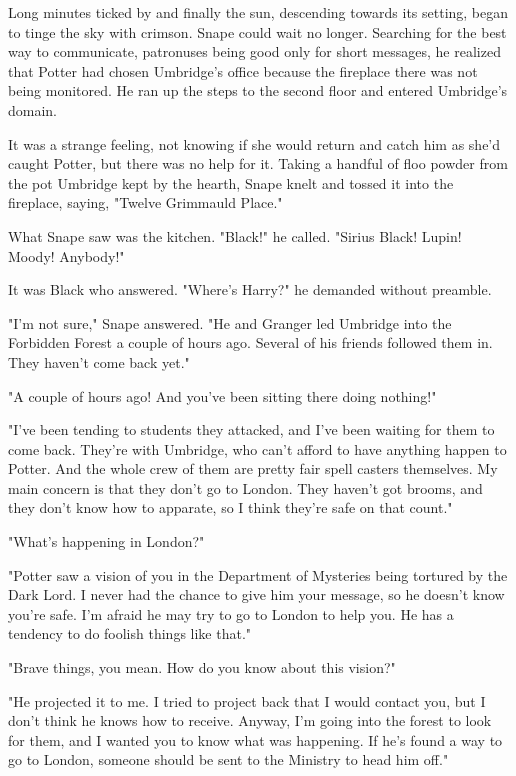 \documentclass[a4paper,11pt]{article}
\begin{document}
Long minutes ticked by and finally the sun, descending towards its setting, began to tinge the sky with crimson. Snape could wait no longer. Searching for the best way to communicate, patronuses being good only for short messages, he realized that Potter had chosen Umbridge's office because the fireplace there was not being monitored. He ran up the steps to the second floor and entered Umbridge's domain.

It was a strange feeling, not knowing if she would return and catch him as she'd caught Potter, but there was no help for it. Taking a handful of floo powder from the pot Umbridge kept by the hearth, Snape knelt and tossed it into the fireplace, saying, "Twelve Grimmauld Place."

What Snape saw was the kitchen. "Black!" he called. "Sirius Black! Lupin! Moody! Anybody!"

It was Black who answered. "Where's Harry?" he demanded without preamble.

"I'm not sure," Snape answered. "He and Granger led Umbridge into the Forbidden Forest a couple of hours ago. Several of his friends followed them in. They haven't come back yet."

"A couple of hours ago! And you've been sitting there doing nothing!"

"I've been tending to students they attacked, and I've been waiting for them to come back. They're with Umbridge, who can't afford to have anything happen to Potter. And the whole crew of them are pretty fair spell casters themselves. My main concern is that they don't go to London. They haven't got brooms, and they don't know how to apparate, so I think they're safe on that count."

"What's happening in London?"

"Potter saw a vision of you in the Department of Mysteries being tortured by the Dark Lord. I never had the chance to give him your message, so he doesn't know you're safe. I'm afraid he may try to go to London to help you. He has a tendency to do foolish things like that."

"Brave things, you mean. How do you know about this vision?"

"He projected it to me. I tried to project back that I would contact you, but I don't think he knows how to receive. Anyway, I'm going into the forest to look for them, and I wanted you to know what was happening. If he's found a way to go to London, someone should be sent to the Ministry to head him off."
\end{document}

